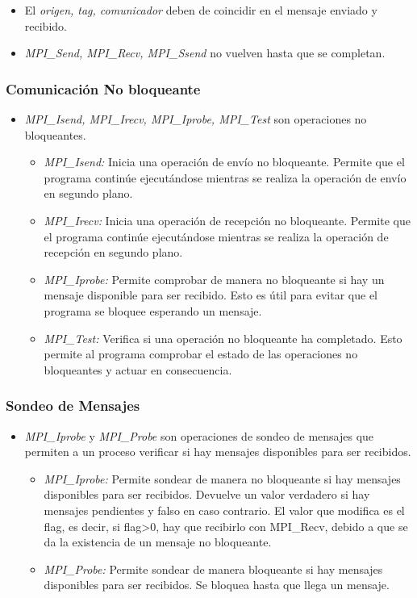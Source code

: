 \documentclass[a4paper,12pt]{article}
\begin{document}
\begin{itemize}
    \item El \textit{origen, tag, comunicador} deben de coincidir en el mensaje enviado y recibido.
    \item \textit{MPI\_Send, MPI\_Recv, MPI\_Ssend} no vuelven hasta que se completan.
\end{itemize}

\subsubsection{Comunicación No bloqueante}
\begin{itemize}
    \item \textit{MPI\_Isend, MPI\_Irecv, MPI\_Iprobe, MPI\_Test} son operaciones no bloqueantes.
\begin{itemize}
    \item \textit{MPI\_Isend:} Inicia una operación de envío no bloqueante. Permite que el programa continúe ejecutándose mientras se realiza la operación de envío en segundo plano.
    \item \textit{MPI\_Irecv:} Inicia una operación de recepción no bloqueante. Permite que el programa continúe ejecutándose mientras se realiza la operación de recepción en segundo plano.
    \item \textit{MPI\_Iprobe:} Permite comprobar de manera no bloqueante si hay un mensaje disponible para ser recibido. Esto es útil para evitar que el programa se bloquee esperando un mensaje.
    \item \textit{MPI\_Test:} Verifica si una operación no bloqueante ha completado. Esto permite al programa comprobar el estado de las operaciones no bloqueantes y actuar en consecuencia.
\end{itemize}
\end{itemize}

\subsubsection{Sondeo de Mensajes}
\begin{itemize}
    \item \textit{MPI\_Iprobe} y \textit{MPI\_Probe} son operaciones de sondeo de mensajes que permiten a un proceso verificar si hay mensajes disponibles para ser recibidos.
    \begin{itemize}
        \item \textit{MPI\_Iprobe:} Permite sondear de manera no bloqueante si hay mensajes disponibles para ser recibidos. Devuelve un valor verdadero si hay mensajes pendientes y falso en caso contrario. El valor que modifica es el flag, es decir, si flag>0, hay que recibirlo con MPI\_Recv, debido a que se da la existencia de un mensaje no bloqueante.
        \item \textit{MPI\_Probe:} Permite sondear de manera bloqueante si hay mensajes disponibles para ser recibidos. Se bloquea hasta que llega un mensaje.
    \end{itemize}
\end{itemize}
\end{document}
